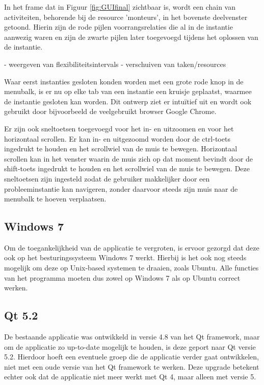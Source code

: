 In het frame dat in Figuur \ref{fig:GUIfinal} zichtbaar is, wordt een chain van activiteiten, behorende bij de resource 'monteurs', in het bovenste deelvenster getoond. Hierin zijn de rode pijlen voorrangsrelaties die al in de instantie aanwezig waren en zijn de zwarte pijlen later toegevoegd tijdens het oplossen van de instantie.


- weergeven van flexibiliteitsintervals
- verschuiven van taken/resources

Waar eerst instanties gesloten konden worden met een grote rode knop in de menubalk, is er nu op elke tab van een instantie een kruisje geplaatst, waarmee de instantie gesloten kan worden. Dit ontwerp ziet er intu\"itief uit en wordt ook gebruikt door bijvoorbeeld de veelgebruikt browser Google Chrome.

Er zijn ook sneltoetsen toegevoegd voor het in- en uitzoomen en voor het horizontaal scrollen. Er kan in- en uitgezoomd worden door de ctrl-toets ingedrukt te houden en het scrollwiel van de muis  te bewegen. Horizontaal scrollen kan in het venster waarin de muis zich op dat moment bevindt door de shift-toets ingedrukt te houden en het scrollwiel van de muis te bewegen. Deze sneltoetsen zijn ingesteld zodat de gebruiker makkelijker door een probleeminstantie kan navigeren, zonder daarvoor steeds zijn muis naar de menubalk te hoeven verplaatsen.

\subsection{Windows 7}
Om de toegankelijkheid van de applicatie te vergroten, is ervoor gezorgd dat deze ook op het besturingssysteem Windows 7 werkt. Hierbij is het ook nog steeds mogelijk om deze op Unix-based systemen te draaien, zoals Ubuntu. Alle functies van het programma moeten dus zowel op Windows 7 als op Ubuntu correct werken.

\subsection{Qt 5.2}
De bestaande applicatie was ontwikkeld in versie 4.8 van het Qt framework, maar om de applicatie zo up-to-date mogelijk te houden, is deze geport naar Qt versie 5.2. Hierdoor hoeft een eventuele groep die de applicatie verder gaat ontwikkelen, niet met een oude versie van het Qt framework te werken. Deze upgrade betekent echter ook dat de applicatie niet meer werkt met Qt 4, maar alleen met versie 5.
